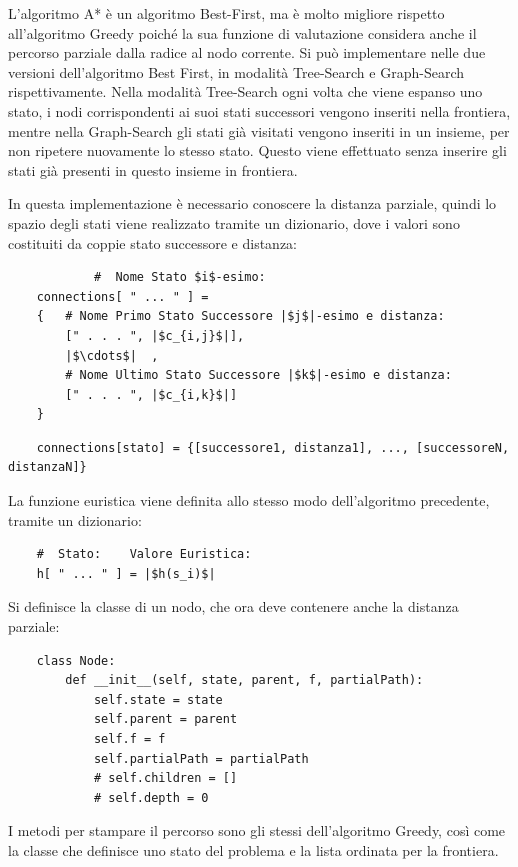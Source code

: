 \documentclass{article}
\numberwithin{equation}{subsection}
\begin{document}
L'algoritmo A* è un algoritmo Best-First, ma è molto migliore rispetto all'algoritmo Greedy 
poiché la sua funzione di valutazione considera anche il percorso parziale dalla 
radice al nodo corrente. Si può implementare nelle due versioni dell'algoritmo Best First, 
in modalità Tree-Search e Graph-Search rispettivamente. 
Nella modalità Tree-Search ogni volta che viene espanso uno stato, i nodi corrispondenti 
ai suoi stati successori vengono inseriti nella frontiera, mentre nella Graph-Search gli 
stati già visitati vengono inseriti in un insieme, per non ripetere nuovamente lo stesso 
stato. Questo viene effettuato senza inserire gli stati già presenti in questo insieme 
in frontiera. 

In questa implementazione è necessario conoscere la distanza parziale, quindi lo spazio 
degli stati viene realizzato tramite un dizionario, dove i valori sono costituiti da coppie 
stato successore e distanza:
\begin{verbatim}
            #  Nome Stato $i$-esimo:
    connections[ " ... " ] = 
    {   # Nome Primo Stato Successore |$j$|-esimo e distanza:
        [" . . . ", |$c_{i,j}$|], 
        |$\cdots$|  , 
        # Nome Ultimo Stato Successore |$k$|-esimo e distanza:
        [" . . . ", |$c_{i,k}$|] 
    }
\end{verbatim}
\begin{verbatim}
    connections[stato] = {[successore1, distanza1], ..., [successoreN, distanzaN]}
\end{verbatim}

La funzione euristica viene definita allo stesso modo dell'algoritmo precedente, 
tramite un dizionario:
\begin{verbatim}
    #  Stato:    Valore Euristica:
    h[ " ... " ] = |$h(s_i)$|
\end{verbatim}

Si definisce la classe di un nodo, che ora deve contenere anche la distanza parziale:
\begin{verbatim}
    class Node:
        def __init__(self, state, parent, f, partialPath):
            self.state = state
            self.parent = parent
            self.f = f
            self.partialPath = partialPath
            # self.children = []
            # self.depth = 0
\end{verbatim}

I metodi per stampare il percorso sono gli stessi dell'algoritmo Greedy, così come la 
classe che definisce uno stato del problema e la lista ordinata per la frontiera.
\end{document}
